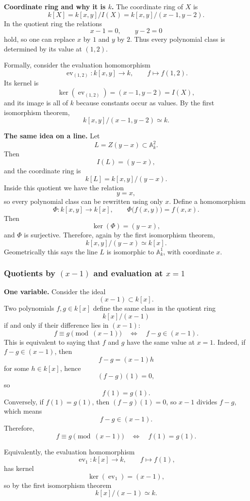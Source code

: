 \documentclass[12pt,a4paper]{article}
\theoremstyle{plain}
\theoremstyle{definition}      %
\begin{document}
\textbf{Coordinate ring and why it is \(k\).}
The coordinate ring of \(X\) is
\[
k[X]=k[x,y]/I(X)=k[x,y]/(x-1,y-2).
\]
In the quotient ring the relations
\[
x-1=0,
\qquad
y-2=0
\]
hold, so one can replace \(x\) by \(1\) and \(y\) by \(2\).
Thus every polynomial class is determined by its value at \((1,2)\).

Formally, consider the evaluation homomorphism
\[
\operatorname{ev}_{(1,2)}:k[x,y]\to k,
\qquad
f\mapsto f(1,2).
\]
Its kernel is
\[
\ker(\operatorname{ev}_{(1,2)})=(x-1,y-2)=I(X),
\]
and its image is all of \(k\) because constants occur as values.
By the first isomorphism theorem,
\[
k[x,y]/(x-1,y-2)\simeq k.
\]

\bigskip

\textbf{The same idea on a line.}
Let
\[
L=Z(y-x)\subset \mathbb A^2_k.
\]
Then
\[
I(L)=(y-x),
\]
and the coordinate ring is
\[
k[L]=k[x,y]/(y-x).
\]
Inside this quotient we have the relation
\[
y=x,
\]
so every polynomial class can be rewritten using only \(x\).
Define a homomorphism
\[
\Phi:k[x,y]\to k[x],
\qquad
\Phi\bigl(f(x,y)\bigr)=f(x,x).
\]
Then
\[
\ker(\Phi)=(y-x),
\]
and \(\Phi\) is surjective.
Therefore, again by the first isomorphism theorem,
\[
k[x,y]/(y-x)\simeq k[x].
\]
Geometrically this says the line \(L\) is isomorphic to \(\mathbb A^1_k\), with coordinate \(x\).

\subsubsection*{Quotients by \((x-1)\) and evaluation at \(x=1\)}

\textbf{One variable.}
Consider the ideal
\[
(x-1)\subset k[x].
\]
Two polynomials \(f,g\in k[x]\) define the same class in the quotient ring
\[
k[x]/(x-1)
\]
if and only if their difference lies in \((x-1)\):
\[
f\equiv g \pmod{(x-1)}
\quad\Longleftrightarrow\quad
f-g\in (x-1).
\]
This is equivalent to saying that \(f\) and \(g\) have the same value at \(x=1\).
Indeed, if \(f-g\in(x-1)\), then
\[
f-g=(x-1)h
\]
for some \(h\in k[x]\), hence
\[
(f-g)(1)=0,
\]
so
\[
f(1)=g(1).
\]
Conversely, if \(f(1)=g(1)\), then \((f-g)(1)=0\), so \(x-1\) divides \(f-g\), which means
\[
f-g\in(x-1).
\]
Therefore,
\[
f\equiv g \pmod{(x-1)}
\quad\Longleftrightarrow\quad
f(1)=g(1).
\]

Equivalently, the evaluation homomorphism
\[
\operatorname{ev}_1:k[x]\to k,
\qquad
f\mapsto f(1),
\]
has kernel
\[
\ker(\operatorname{ev}_1)=(x-1),
\]
so by the first isomorphism theorem
\[
k[x]/(x-1)\simeq k.
\]
\end{document}
